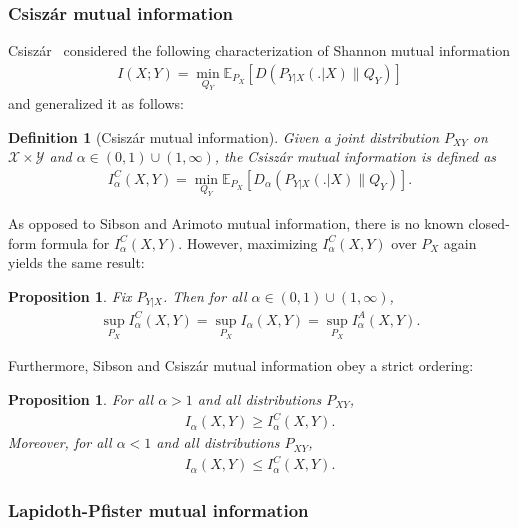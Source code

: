 \documentclass{article}
\numberwithin{theorem}{section}
\numberwithin{example}{section}
\numberwithin{remark}{section}
\newtheorem{definition}{Definition}
\numberwithin{definition}{section}
\newtheorem{proposition}[theorem]{Proposition}
\newcommand{\E}{\mathbb{E}}
\newcommand{\X}{\mathcal{X}}
\newcommand{\Y}{\mathcal{Y}}
\newcommand{\range}{(0,1) \cup (1,\infty)}
\begin{document}
\subsubsection{Csisz{\'a}r mutual information}
Csisz{\'a}r~\cite{csiszar:95} considered the following characterization of Shannon mutual information
\begin{align}
    I(X;Y) = \min_{Q_Y} \E_{P_X} \left[ D \left( P_{Y|X}(.|X) \| Q_Y \right) \right]
\end{align}
and generalized it as follows:
\begin{definition}[Csisz\'ar mutual information] \label{def:csiszar-MI}
    Given a joint distribution $P_{XY}$ on $\X \times \Y$ and $\alpha \in \range$, the Csisz\'ar mutual information is defined as
    \begin{align}
        \label{eq:def-csiszar-MI}
        I_\alpha^C(X,Y) = \min_{Q_Y} \E_{P_X} \left[  D_\alpha \left( P_{Y|X}(.|X) \| Q_Y \right)\right].
    \end{align}
\end{definition}
As opposed to Sibson and Arimoto mutual information, there is no known closed-form formula for $I_\alpha^C(X,Y)$. However, maximizing $I_\alpha^C(X,Y)$ over $P_X$ again yields the same result:
\begin{proposition}
    \label{prop:csiszarMI-max}
    Fix $P_{Y|X}$. Then for all $\alpha \in \range$,
    \begin{align}
        \label{eq:prop-csiszarMI-max}
          \sup_{P_X} I_\alpha^C(X,Y) = \sup_{P_X} I_\alpha(X,Y) = \sup_{P_X} I^A_\alpha(X,Y). 
    \end{align}
\end{proposition}
Furthermore, Sibson and Csisz\'ar mutual information obey a strict ordering:
\begin{proposition}
    \label{prop:csiszar-sibson-ordering}
    For all $\alpha >1$ and all distributions $P_{XY}$,
    \begin{align}
        I_\alpha(X,Y) \geq I_\alpha^C(X,Y).
    \end{align}
    Moreover, for all $\alpha <1$ and all distributions $P_{XY}$,
    \begin{align}
        I_\alpha(X,Y) \leq I_\alpha^C(X,Y).
    \end{align}
\end{proposition}



\subsubsection{Lapidoth-Pfister mutual information}
\end{document}
